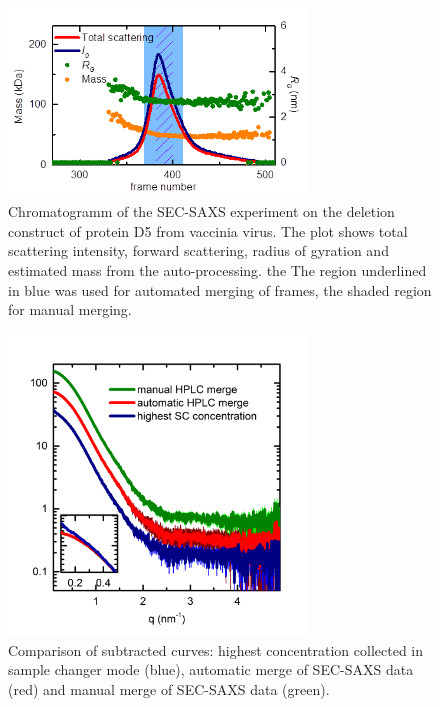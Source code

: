 \documentclass[preprint,pdf]{iucr}              %
\begin{document}
\begin{figure}
\centering
\includegraphics[width=8cm]{sec.png}%
\caption{Chromatogramm of the SEC-SAXS experiment on the deletion construct of protein D5 from vaccinia virus. The plot shows total scattering intensity, forward scattering, radius of gyration and estimated mass from the auto-processing. the The region underlined in blue was used for automated merging of frames, the shaded region for manual merging.}
\label{fgr:SEC}
\end{figure}

\begin{figure}
\centering
\includegraphics[width=8cm]{curves.png}%
\caption{Comparison of subtracted curves: highest concentration collected in  sample changer mode (blue), automatic merge of SEC-SAXS data (red) and manual merge of SEC-SAXS data (green). }
\label{fgr:curves}
\end{figure}
\end{document}
